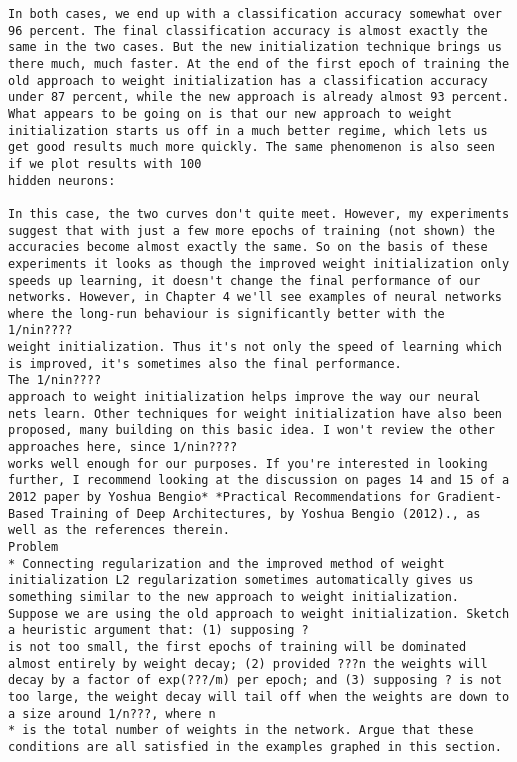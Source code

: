 \begin{lstlisting}
In both cases, we end up with a classification accuracy somewhat over 96 percent. The final classification accuracy is almost exactly the same in the two cases. But the new initialization technique brings us there much, much faster. At the end of the first epoch of training the old approach to weight initialization has a classification accuracy under 87 percent, while the new approach is already almost 93 percent. What appears to be going on is that our new approach to weight initialization starts us off in a much better regime, which lets us get good results much more quickly. The same phenomenon is also seen if we plot results with 100
hidden neurons:

In this case, the two curves don't quite meet. However, my experiments suggest that with just a few more epochs of training (not shown) the accuracies become almost exactly the same. So on the basis of these experiments it looks as though the improved weight initialization only speeds up learning, it doesn't change the final performance of our networks. However, in Chapter 4 we'll see examples of neural networks where the long-run behaviour is significantly better with the 1/nin????
weight initialization. Thus it's not only the speed of learning which is improved, it's sometimes also the final performance.
The 1/nin????
approach to weight initialization helps improve the way our neural nets learn. Other techniques for weight initialization have also been proposed, many building on this basic idea. I won't review the other approaches here, since 1/nin????
works well enough for our purposes. If you're interested in looking further, I recommend looking at the discussion on pages 14 and 15 of a 2012 paper by Yoshua Bengio* *Practical Recommendations for Gradient-Based Training of Deep Architectures, by Yoshua Bengio (2012)., as well as the references therein.
Problem
* Connecting regularization and the improved method of weight initialization L2 regularization sometimes automatically gives us something similar to the new approach to weight initialization. Suppose we are using the old approach to weight initialization. Sketch a heuristic argument that: (1) supposing ?
is not too small, the first epochs of training will be dominated almost entirely by weight decay; (2) provided ???n the weights will decay by a factor of exp(???/m) per epoch; and (3) supposing ? is not too large, the weight decay will tail off when the weights are down to a size around 1/n???, where n
* is the total number of weights in the network. Argue that these conditions are all satisfied in the examples graphed in this section. 

\end{lstlisting}
